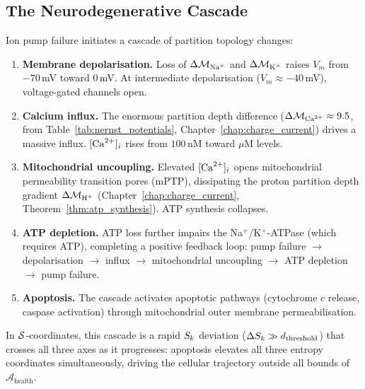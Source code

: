 \subsection{The Neurodegenerative Cascade}
\label{ssec:neurodeg_cascade}

Ion pump failure initiates a cascade of partition topology changes:
\begin{enumerate}
  \item \textbf{Membrane depolarisation.} Loss of $\Delta\Depth_{\ce{Na+}}$
        and $\Delta\Depth_{\ce{K+}}$ raises $V_m$ from $-70$\,mV toward
        $0$\,mV. At intermediate depolarisation ($V_m \approx -40$\,mV),
        voltage-gated  channels open.

  \item \textbf{Calcium influx.} The enormous  partition depth
        difference ($\Delta\Depth_{\ce{Ca^{2+}}} \approx 9.5$, from
        Table~\ref{tab:nernst_potentials}, Chapter~\ref{chap:charge_current})
        drives a massive  influx.
        $[\ce{Ca^{2+}}]_i$ rises from $100$\,nM toward $\mu$M levels.

  \item \textbf{Mitochondrial uncoupling.} Elevated $[\ce{Ca^{2+}}]_i$
        opens mitochondrial permeability transition pores (mPTP), dissipating
        the proton partition depth gradient $\Delta\Depth_{\ce{H+}}$
        (Chapter~\ref{chap:charge_current}, Theorem~\ref{thm:atp_synthesis}).
        ATP synthesis collapses.

  \item \textbf{ATP depletion.} ATP loss further impairs the Na$^+$/K$^+$-ATPase
        (which requires ATP), completing a positive feedback loop:
        pump failure $\to$ depolarisation $\to$  influx
        $\to$ mitochondrial uncoupling $\to$ ATP depletion
        $\to$ pump failure.

  \item \textbf{Apoptosis.} The cascade activates apoptotic pathways
        (cytochrome $c$ release, caspase activation) through
        mitochondrial outer membrane permeabilisation.
\end{enumerate}

In $\mathcal{S}$-coordinates, this cascade is a rapid $S_k$ deviation
($\Delta S_k \gg d_{\mathrm{threshold}}$) that crosses all three axes as it
progresses: apoptosis elevates all three entropy coordinates simultaneously,
driving the cellular trajectory outside all bounds of $\mathcal{A}_{\mathrm{health}}$.


